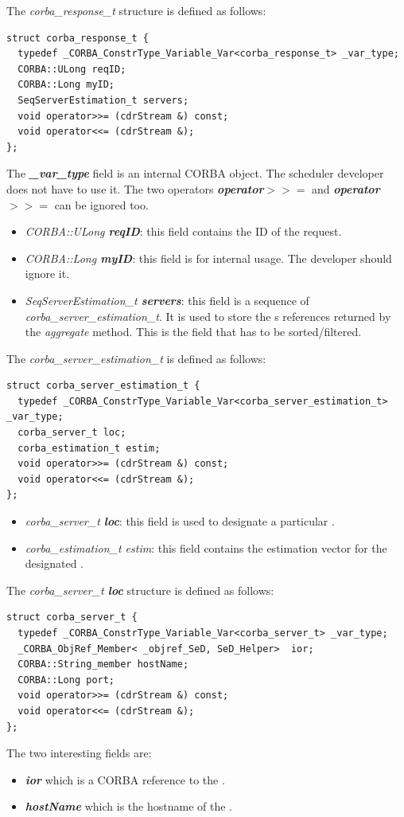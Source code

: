 \noindent The \textit{corba\_response\_t} structure is defined as follows:
\begin{verbatim}
struct corba_response_t {
  typedef _CORBA_ConstrType_Variable_Var<corba_response_t> _var_type;  
  CORBA::ULong reqID;
  CORBA::Long myID;
  SeqServerEstimation_t servers;
  void operator>>= (cdrStream &) const;
  void operator<<= (cdrStream &);
};
\end{verbatim}

\noindent The \textit{\bf \_var\_type} field is an internal CORBA object. The
scheduler developer does not have to use it. The two operators
\textit{\bf operator$>>=$} and \textit{\bf operator$>>=$} can be ignored too.
\begin{itemize}
  \item \textit{CORBA::ULong \bf reqID}: this field contains the ID of the
    request.
  \item \textit{CORBA::Long \bf myID}: this field is for \diet internal usage.
    The developer should ignore it.
  \item \textit{SeqServerEstimation\_t \bf servers}: this field is a sequence
    of \textit{corba\_server\_estimation\_t}. It is used to store the {\sed}s
    references returned by the \textit{aggregate} method. This is the field
    that has to be sorted/filtered.
\end{itemize}

\noindent The \textit{corba\_server\_estimation\_t} is defined as follows:
\begin{verbatim}
struct corba_server_estimation_t {
  typedef _CORBA_ConstrType_Variable_Var<corba_server_estimation_t> _var_type;
  corba_server_t loc;
  corba_estimation_t estim;
  void operator>>= (cdrStream &) const;
  void operator<<= (cdrStream &);
};
\end{verbatim}
\begin{itemize}
  \item \textit{corba\_server\_t \bf loc}: this field is used to designate a
    particular {\sed}.
  \item \textit{corba\_estimation\_t estim}: this field contains the estimation
    vector for the designated {\sed}.
\end{itemize}

\noindent The \textit{corba\_server\_t \bf loc} structure is defined as
follows:
\begin{verbatim}
struct corba_server_t {
  typedef _CORBA_ConstrType_Variable_Var<corba_server_t> _var_type;  
  _CORBA_ObjRef_Member< _objref_SeD, SeD_Helper>  ior;
  CORBA::String_member hostName;
  CORBA::Long port;
  void operator>>= (cdrStream &) const;
  void operator<<= (cdrStream &);
};
\end{verbatim}
The two interesting fields are:
\begin{itemize}
  \item \textit{\bf ior} which is a CORBA reference to the {\sed}.
  \item \textit{\bf hostName} which is the hostname of the {\sed}.
\end{itemize}

